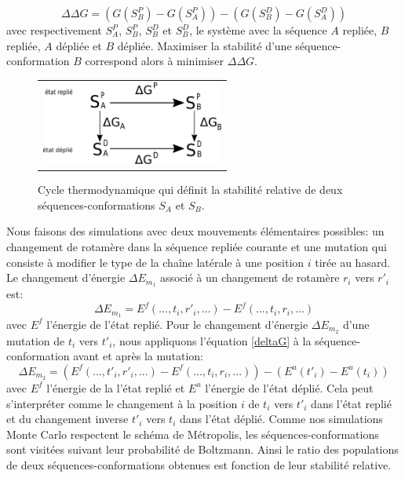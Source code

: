 \begin{equation}
  \label{deltaG}
\Delta \Delta G = (G(S^P_B)- G(S^P_A)) - (G(S^D_B)- G(S^D_A))
\end{equation}  
avec respectivement $S^P_A$, $S^P_B$, $S^D_B$ et $S^D_B$, le système avec la séquence $A$ repliée, $B$ repliée, $A$ dépliée et $B$ dépliée. Maximiser la stabilité d'une séquence-conformation $B$ correspond alors à minimiser $\Delta \Delta G$.

   \begin{figure}[!htbp]
     \centering
     \begin{tabular}{c}
       \includegraphics[width=6cm]{figure/cycleThermo.pdf} \\
     \end{tabular}
     
     \caption{Cycle thermodynamique qui définit la stabilité relative de deux séquences-conformations $S_A$ et $S_B$.}
\label{fig:cycleThermo}
   \end{figure}


Nous faisons des simulations avec deux mouvements élémentaires possibles: un changement de rotamère dans la séquence repliée courante et une mutation qui consiste à modifier le type de la chaîne latérale à une position $i$ tirée au hasard. Le changement d'énergie $\Delta E_{m_1}$ associé à un changement de rotamère $r_i$ vers $r'_i$ est:
\begin{equation}
\Delta E_{m_1}= E^f(...,t_i,r'_i,...) - E^f(...,t_i,r_i,...)     
\end{equation}   
avec $E^f$ l'énergie de l'état replié. Pour le changement d'énergie $\Delta E_{m_2}$ d'une mutation de $t_i$ vers $t'_i$, nous appliquons l'équation \ref{deltaG} à la séquence-conformation avant et après la mutation:    
\begin{equation}
\Delta E_{m_2}= (E^f(...,t'_i,r'_i,...) - E^f(...,t_i,r_i,...)) - (E^u(t'_i) - E^u(t_i))     
\end{equation}   
avec $E^f$ l'énergie de la l'état replié et $E^u$ l'énergie de l'état déplié. Cela peut s'interpréter comme le changement à la position $i$ de $t_i$ vers $t'_i$ dans l'état replié et du changement inverse $t'_i$ vers $t_i$ dans l'état déplié. Comme nos simulations Monte Carlo respectent le schéma de Métropolis, les séquences-conformations sont visitées suivant leur probabilité de Boltzmann. Ainsi le ratio des populations de deux séquences-conformations obtenues est fonction de leur stabilité relative. 
   

